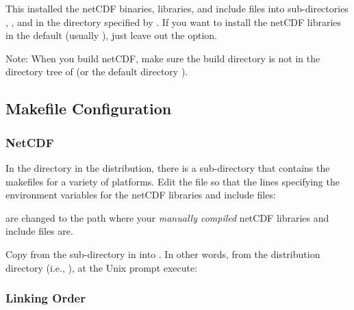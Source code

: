 This installed the netCDF binaries, libraries, and include files into
sub-directories , , and  in 
the directory specified by .
If you want to install the netCDF libraries in the default
(usually ), just leave out the 
option.

Note:  When you build netCDF, make sure the build directory
is not in the directory tree of 
(or the default directory ).




\subsection{Makefile Configuration}  \label{sec:osx.makefile}

	\subsubsection{NetCDF}

In the  directory in the  distribution, there is a
sub-directory  that contains the makefiles for a
variety of platforms.  Edit the file 
so that the lines specifying the environment variables for the
netCDF libraries and include files:

\begin{codeblock}
\end{codeblock}

are changed to the path where your \emph{manually compiled} 
netCDF libraries and include files are.

Copy  from the  sub-directory
in  into .  
In other words, from the  distribution directory
(i.e., ), at the Unix prompt execute:

\begin{codeblock}
\end{codeblock}


	\subsubsection{Linking Order}

